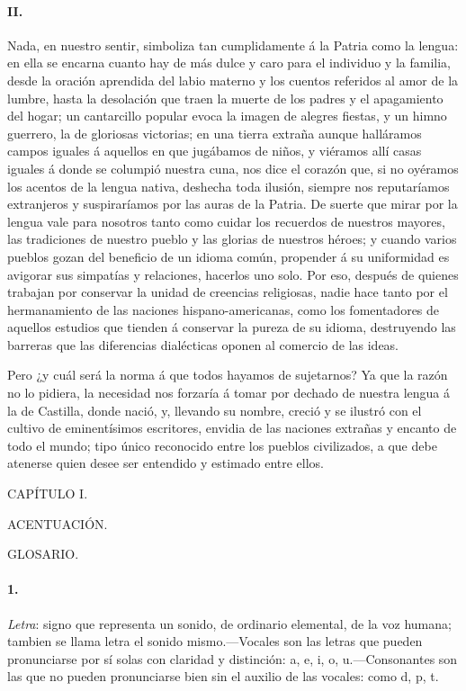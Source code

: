 \documentclass{book}
\begin{document}
\paragraph{II.}

Nada, en nuestro sentir, simboliza tan cumplidamente á la Patria como la lengua: en ella se 
encarna cuanto hay de más dulce y caro para el individuo y la familia, desde la oración 
aprendida del labio materno y los cuentos referidos al amor de la lumbre, hasta la desolación 
que traen la muerte de los padres y el apagamiento del hogar; un cantarcillo popular evoca la 
imagen de alegres fiestas, y un himno guerrero, la de gloriosas victorias; en una tierra 
extraña aunque halláramos campos iguales á aquellos en que jugábamos de niños, y viéramos allí 
casas iguales á donde se columpió nuestra cuna, nos dice el corazón que, si no oyéramos los 
acentos de la lengua nativa, deshecha toda ilusión, siempre nos reputaríamos extranjeros y 
suspiraríamos por las auras de la Patria. De suerte que mirar por la lengua vale para nosotros 
tanto como cuidar los recuerdos de nuestros mayores, las tradiciones de nuestro pueblo y las 
glorias de nuestros héroes; y cuando varios pueblos gozan del beneficio de un idioma común, 
propender á su uniformidad es avigorar sus simpatías y relaciones, hacerlos uno solo. Por eso, 
después de quienes trabajan por conservar la unidad de creencias religiosas, nadie hace tanto 
por el hermanamiento de las naciones hispano-americanas, como los fomentadores de aquellos 
estudios que tienden á conservar la pureza de su idioma, destruyendo las barreras que las 
diferencias dialécticas oponen al comercio de las ideas. 

Pero ¿y cuál será la norma á que todos hayamos de sujetarnos? Ya que la razón no lo pidiera, la 
necesidad nos forzaría á tomar por dechado de nuestra lengua á la de Castilla, donde nació, y, 
llevando su nombre, creció y se ilustró con el cultivo de eminentísimos escritores, envidia de 
las naciones extrañas y encanto de todo el mundo; tipo único reconocido entre los pueblos 
civilizados, a que debe atenerse quien desee ser entendido y estimado entre ellos.

CAPÍTULO I.

ACENTUACIÓN.

GLOSARIO.

\paragraph{1.} \emph{Letra}: signo que representa un sonido, de ordinario elemental, de la voz humana; 
tambien se llama letra el sonido mismo.---Vocales son las letras que pueden pronunciarse por sí solas con 
claridad y distinción: a, e, i, o, u.---Consonantes son las que no pueden pronunciarse bien sin el 
auxilio de las vocales: como d, p, t.
\end{document}
